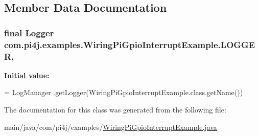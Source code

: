 \subsection{Member Data Documentation}
\hypertarget{classcom_1_1pi4j_1_1examples_1_1WiringPiGpioInterruptExample_a2d2a1b14941113d371ddc16140d2dec1}{}
\subsubsection[{L\+O\+G\+G\+E\+R}]{\setlength{\rightskip}{0pt plus 5cm}final Logger com.\+pi4j.\+examples.\+Wiring\+Pi\+Gpio\+Interrupt\+Example.\+L\+O\+G\+G\+E\+R\hspace{0.3cm}{\ttfamily [static]}, {\ttfamily [private]}}\label{classcom_1_1pi4j_1_1examples_1_1WiringPiGpioInterruptExample_a2d2a1b14941113d371ddc16140d2dec1}
{\bfseries Initial value\+:}
\begin{DoxyCode}
= LogManager
            .getLogger(WiringPiGpioInterruptExample.class.getName())
\end{DoxyCode}


The documentation for this class was generated from the following file\+:\begin{DoxyCompactItemize}
\item 
main/java/com/pi4j/examples/\hyperlink{WiringPiGpioInterruptExample_8java}{Wiring\+Pi\+Gpio\+Interrupt\+Example.\+java}\end{DoxyCompactItemize}
